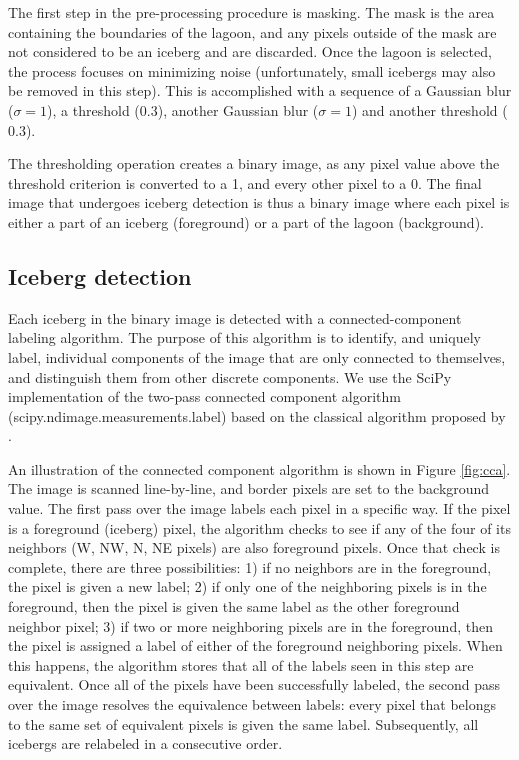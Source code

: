 The first step in the pre-processing procedure is masking. The mask is the area containing the boundaries of the lagoon, and any pixels outside of the mask are not considered to be an iceberg and are discarded. Once the lagoon is selected, the process focuses on minimizing noise (unfortunately, small icebergs may also be removed in this step).  This is accomplished with a sequence of a Gaussian blur ($\sigma=1$), a threshold ($0.3$), another Gaussian blur ($\sigma=1$) and another threshold ($0.3$). 

The thresholding operation creates a binary image, as any pixel value above the threshold criterion is converted to a 1, and every other pixel to a 0. The final image that undergoes iceberg detection is thus a binary image where each pixel is either a part of an iceberg (foreground) or a part of the lagoon (background).

\subsection{Iceberg detection}
Each iceberg in the binary image is detected with a connected-component labeling algorithm. The purpose of this algorithm is to identify, and uniquely label, individual components of the image that are only connected to themselves, and distinguish them from other discrete components. We use the SciPy implementation of the two-pass connected component algorithm (scipy.ndimage.measurements.label) based on the classical algorithm proposed by \citet{rosenfeld1966sequential}. 

An illustration of the connected component algorithm is shown in Figure \ref{fig:cca}. The image is scanned line-by-line, and border pixels are set to the background value. The first pass over the image labels each pixel in a specific way. If the pixel is a foreground (iceberg) pixel, the algorithm checks to see if any of the four of its neighbors (W, NW, N, NE pixels) are also foreground pixels. Once that check is complete, there are three possibilities: 1) if no neighbors are in the foreground, the pixel is given a new label; 2) if only one of the neighboring pixels is in the foreground, then the pixel is given the same label as the other foreground neighbor pixel; 3) if two or more neighboring pixels are in the foreground, then the pixel is assigned a label of either of the foreground neighboring pixels. When this happens, the algorithm stores that all of the labels seen in this step are equivalent. 
Once all of the pixels have been successfully labeled, the second pass over the image resolves the equivalence between labels: every pixel that belongs to the same set of equivalent pixels is given the same label. Subsequently, all icebergs are relabeled in a consecutive order.


